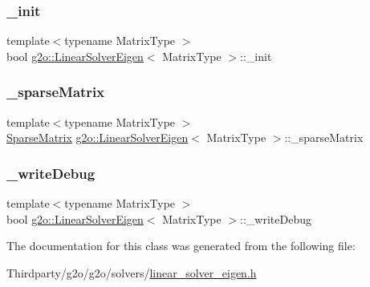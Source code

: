 \mbox{\label{classg2o_1_1_linear_solver_eigen_a52c02e9b24e4f6ade190e6adb29b05b4}} 
\subsubsection{\texorpdfstring{\+\_\+init}{\_init}}
{\footnotesize\ttfamily template$<$typename Matrix\+Type $>$ \\
bool \mbox{\hyperlink{classg2o_1_1_linear_solver_eigen}{g2o\+::\+Linear\+Solver\+Eigen}}$<$ Matrix\+Type $>$\+::\+\_\+init\hspace{0.3cm}{\ttfamily [protected]}}

\mbox{\label{classg2o_1_1_linear_solver_eigen_a39682995a9cf32dc79848281c6d4d9b9}} 
\subsubsection{\texorpdfstring{\+\_\+sparse\+Matrix}{\_sparseMatrix}}
{\footnotesize\ttfamily template$<$typename Matrix\+Type $>$ \\
\mbox{\hyperlink{classg2o_1_1_linear_solver_eigen_aeb7e2400bed3a249b5f29ce7cc00cd33}{Sparse\+Matrix}} \mbox{\hyperlink{classg2o_1_1_linear_solver_eigen}{g2o\+::\+Linear\+Solver\+Eigen}}$<$ Matrix\+Type $>$\+::\+\_\+sparse\+Matrix\hspace{0.3cm}{\ttfamily [protected]}}

\mbox{\label{classg2o_1_1_linear_solver_eigen_a2d331575853451fc94ca6f6420f0bdcb}} 
\subsubsection{\texorpdfstring{\+\_\+write\+Debug}{\_writeDebug}}
{\footnotesize\ttfamily template$<$typename Matrix\+Type $>$ \\
bool \mbox{\hyperlink{classg2o_1_1_linear_solver_eigen}{g2o\+::\+Linear\+Solver\+Eigen}}$<$ Matrix\+Type $>$\+::\+\_\+write\+Debug\hspace{0.3cm}{\ttfamily [protected]}}



The documentation for this class was generated from the following file\+:\begin{DoxyCompactItemize}
\item 
Thirdparty/g2o/g2o/solvers/\mbox{\hyperlink{linear__solver__eigen_8h}{linear\+\_\+solver\+\_\+eigen.\+h}}\end{DoxyCompactItemize}
